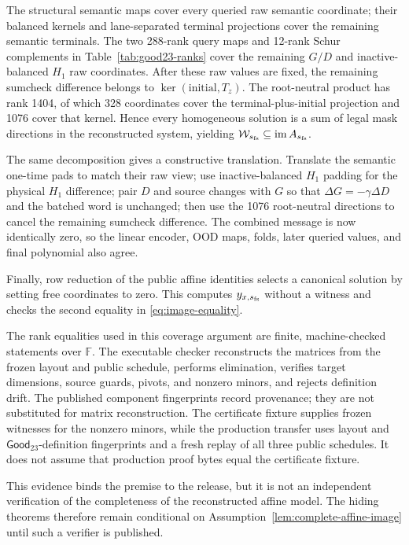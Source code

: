 The structural semantic maps cover every queried raw semantic coordinate;
their balanced kernels and lane-separated terminal projections cover the
remaining semantic terminals.  The two 288-rank query maps and 12-rank Schur
complements in Table~\ref{tab:good23-ranks} cover the remaining \(G/D\) and
inactive-balanced \(H_1\) raw coordinates.  After these raw values are fixed,
the remaining sumcheck difference belongs to
\(\ker(\mathrm{initial},T_z)\).  The root-neutral product has rank 1404, of
which 328 coordinates cover the terminal-plus-initial projection and 1076
cover that kernel.  Hence every homogeneous solution is a sum of legal mask
directions in the reconstructed system, yielding
\(\mathcal W_{s_{\rm fs}}\subseteq\operatorname{im}A_{s_{\rm fs}}\).

The same decomposition gives a constructive translation.  Translate the
semantic one-time pads to match their raw view; use inactive-balanced
\(H_1\) padding for the physical \(H_1\) difference; pair \(D\) and source
changes with \(G\) so that
\(\Delta G=-\gamma\Delta D\) and the batched word is unchanged; then use the
1076 root-neutral directions to cancel the remaining sumcheck difference.
The combined message is now identically zero, so the linear encoder, OOD
maps, folds, later queried values, and final polynomial also agree.

Finally, row reduction of the public affine identities selects a canonical
solution by setting free coordinates to zero.  This computes
\(y_{x,s_{\rm fs}}\) without a witness and checks the second equality in
\eqref{eq:image-equality}.

The rank equalities used in this coverage argument are finite,
machine-checked statements over \(\mathbb F\).  The executable checker
reconstructs the matrices from
the frozen layout and public schedule, performs elimination, verifies target
dimensions, source guards, pivots, and nonzero minors, and rejects definition
drift.  The published component fingerprints record provenance; they are not
substituted for matrix reconstruction.  The certificate fixture supplies
frozen witnesses for the nonzero minors, while the production transfer uses
layout and \(\mathsf{Good}_{23}\)-definition fingerprints and a fresh replay
of all three
public schedules.  It does not assume that production proof bytes equal the
certificate fixture.

This evidence binds the premise to the release, but it is not an independent
verification of the completeness of the reconstructed affine model.  The
hiding theorems therefore remain conditional on
Assumption~\ref{lem:complete-affine-image} until such a verifier is published.

